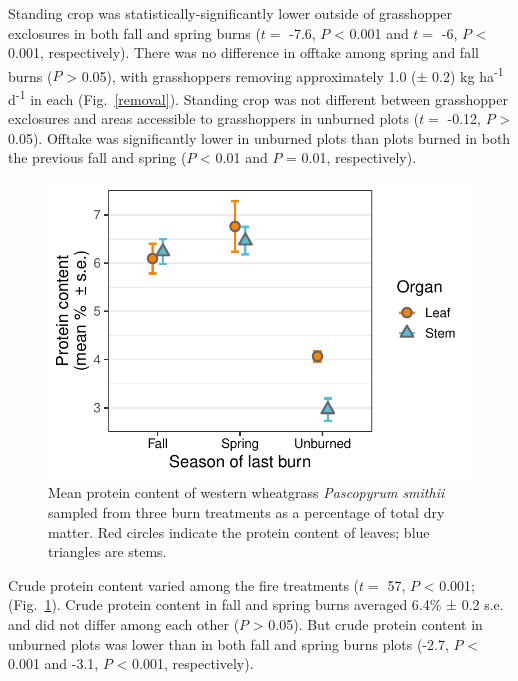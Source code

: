 \documentclass[referee, 
	            sn-basic]
           {sn-jnl}
\begin{document}
\begin{linenumbers}
Standing crop was statistically-significantly lower outside of grasshopper exclosures in both fall and spring burns (\(t =\) -7.6,
\(P\) \textless{} 0.001 and \(t =\) -6, \(P\) \textless{} 0.001, respectively). 
There was no difference in offtake among spring and fall burns (\(P\) \textgreater{} 0.05), with grasshoppers removing approximately 1.0 ($\pm$ 0.2) kg ha\textsuperscript{-1} d\textsuperscript{-1} in each (Fig.~\ref{removal}). 
Standing crop was not different between grasshopper exclosures and areas accessible to grasshoppers in unburned plots (\(t =\) -0.12, \(P\) \textgreater{} 0.05).
 Offtake was significantly lower in unburned plots than plots burned in both the previous fall and spring (\(P\) \textless{} 0.01 and \(P\) = 0.01, respectively).

\begin{figure}
\centering
\includegraphics{value_gg-1.pdf}
\caption{Mean protein content of western wheatgrass \emph{Pascopyrum smithii} sampled from three burn treatments as a percentage of total dry matter. 
Red circles indicate the protein content of leaves; blue triangles are stems.}
 \label{value} %
\end{figure}

Crude protein content varied among the fire treatments (\(t =\) 57, \(P\) \textless{} 0.001; (Fig.~\ref{value}). 
Crude protein content in fall and spring burns averaged 6.4\% ± 0.2 s.e. and did not differ among each other (\(P\) \textgreater{} 0.05). 
But crude protein content in unburned  plots was lower than in both fall and spring burns plots (-2.7, \(P\) \textless{} 0.001 and -3.1, \(P\) \textless{} 0.001, respectively).


\end{linenumbers}
\end{document}
